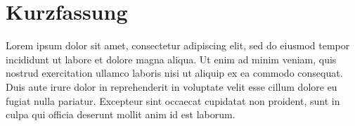 \chapter*{Kurzfassung}

Lorem ipsum dolor sit amet, consectetur adipiscing elit, sed do eiusmod tempor incididunt ut labore et dolore magna aliqua. Ut enim ad minim veniam, quis nostrud exercitation ullamco laboris nisi ut aliquip ex ea commodo consequat. Duis aute irure dolor in reprehenderit in voluptate velit esse cillum dolore eu fugiat nulla pariatur. Excepteur sint occaecat cupidatat non proident, sunt in culpa qui officia deserunt mollit anim id est laborum. 
